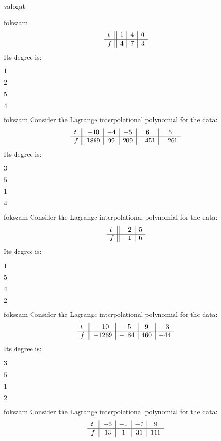\documentclass[12pt]{article}
\begin{document}
\begin{quiz}{valogat}
\begin{multi}{fokszam}
$$\begin{array}{l ||c|c|c}t&1&4&0\\ \hline f&4&7&3 \\ \end{array}$$
Its degree is:
\item* $ 1 $
\item  $ 2 $
\item  $ 5 $
\item  $ 4 $
\end{multi}
\begin{multi}{fokszam}
Consider the Lagrange interpolational polynomial for the data:
$$\begin{array}{l ||c|c|c|c|c}t&-10&-4&-5&6&5\\ \hline f&1869&99&209&-451&-261 \\ \end{array}$$
Its degree is:
\item* $ 3 $
\item  $ 5 $
\item  $ 1 $
\item  $ 4 $
\end{multi}
\begin{multi}{fokszam}
Consider the Lagrange interpolational polynomial for the data:
$$\begin{array}{l ||c|c}t&-2&5\\ \hline f&-1&6 \\ \end{array}$$
Its degree is:
\item* $ 1 $
\item  $ 5 $
\item  $ 4 $
\item  $ 2 $
\end{multi}
\begin{multi}{fokszam}
Consider the Lagrange interpolational polynomial for the data:
$$\begin{array}{l ||c|c|c|c}t&-10&-5&9&-3\\ \hline f&-1269&-184&460&-44 \\ \end{array}$$
Its degree is:
\item* $ 3 $
\item  $ 5 $
\item  $ 1 $
\item  $ 2 $
\end{multi}
\begin{multi}{fokszam}
Consider the Lagrange interpolational polynomial for the data:
$$\begin{array}{l ||c|c|c|c}t&-5&-1&-7&9\\ \hline f&13&1&31&111 \\ \end{array}$$

\end{multi}
\end{quiz}
\end{document}
